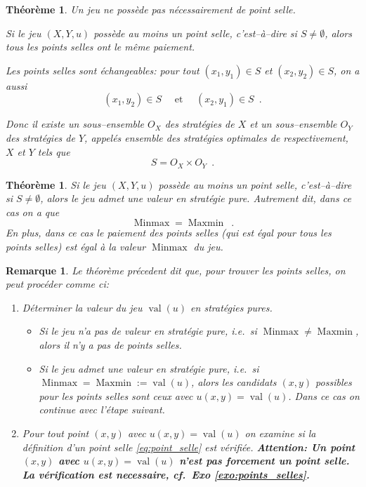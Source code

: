 \documentclass[11pt]{scrartcl}
\theoremstyle{mydefinition}
\newtheorem{rem}[definition]{Remarque}
\theoremstyle{myplain}
\newtheorem{thm}[definition]{Th\'eor\`eme}
\DeclareMathOperator{\Maxmin}{Maxmin}
\DeclareMathOperator{\Minmax}{Minmax}
\DeclareMathOperator{\val}{val}
\begin{document}
\begin{thm}
 Un jeu ne poss\`ede pas n\'ecessairement de point selle. 

Si le jeu $(X,Y,u)$ poss\`ede au moins un point selle, c'est--\`a--dire si $S \neq \emptyset$, alors tous les points selles 
ont le m\^eme paiement. %

Les points selles sont \'echangeables: pour tout $(x_1, y_1)\in S$ et $(x_2, y_2)\in S$, on a aussi
\[ (x_1, y_2) \in S \quad\text{ et }\quad (x_2, y_1) \in S \enspace . \]

Donc il existe un sous--ensemble $O_X$ des strat\'egies de $X$ et un sous--ensemble $O_Y$ des strat\'egies
 de $Y$, appel\'es \emph{ensemble des strat\'egies optimales} de respectivement, $X$ et $Y$ tels que
 \[ S = O_X \times O_Y \enspace . \]
\end{thm}

\begin{thm}
 Si le jeu $(X,Y,u)$ poss\`ede au moins un point selle, c'est--\`a--dire si $S \neq \emptyset$, alors 
   le jeu admet une valeur en strat\'egie pure. Autrement dit, dans ce cas on a que
     \[ \Minmax = \Maxmin \enspace . \]
  En plus, dans ce cas le paiement des points selles (qui est \'egal pour tous les points selles) est \'egal
  \`a la valeur $\Minmax$ du jeu.

\end{thm}

\begin{rem}
 Le th\'eor\`eme pr\'ecedent dit que, pour trouver les points selles, on peut proc\'eder comme ci:
\begin{enumerate}
 \item D\'eterminer la valeur du jeu $\val(u)$ en strat\'egies pures.
   \begin{itemize}
    \item  Si le jeu n'a pas de valeur en strat\'egie pure, i.e.\ si $\Minmax \neq \Maxmin$, alors il n'y a pas de points selles.
    \item Si le jeu admet une valeur en strat\'egie pure, i.e.\ si $\Minmax = \Maxmin:= \val(u)$, alors les candidats $(x,y)$ possibles pour
            les points selles sont ceux avec $u(x,y) = \val(u)$. Dans ce cas on continue avec l'\'etape suivant.
         
   \end{itemize}

 \item Pour tout point $(x,y)$ avec $u(x,y) = \val(u)$ on examine si la d\'efinition d'un point selle  \eqref{eq:point_selle}
       est v\'erifi\'ee.
\textbf{Attention: Un point $(x,y)$ avec $u(x,y) = \val(u)$ n'est pas forcement un point selle. 
          La v\'erification est necessaire, cf.\ Exo \ref{exo:points_selles}.}
\end{enumerate}

\end{rem}
\end{document}
